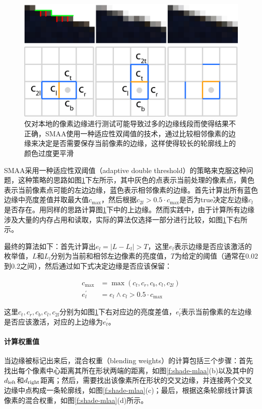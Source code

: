 \begin{figure}
\sidecaption
	\includegraphics[width=.65\textwidth]{figures/shade/local-contrast-adaptation}
	\caption{仅对本地的像素边缘进行测试可能导致过多的边缘线段而使得结果不正确，SMAA使用一种适应性双阈值的技术，通过比较相邻像素的边缘来决定是否需要保存当前像素的边缘，这样使得较长的轮廓线上的颜色过度更平滑}
	\label{f:shade-local-contrast-adaptation}
\end{figure}

SMAA采用一种适应性双阈值（adaptive double threshold）的策略来克服这种问题，这种策略的思路如图\ref{f:shade-local-contrast-adaptation}下左所示，其中灰色的点表示当前处理的像素点，黄色表示当前像素点可能的左边边缘，蓝色表示相邻像素的边缘。首先计算出所有蓝色边缘中亮度差值并取最大值$c_{\max}$，然后根据$c_{2l}>0.5\cdot c_{\max}$是否为true决定左边缘$c_l$是否存在。用同样的思路计算图\ref{f:shade-local-contrast-adaptation}下中的上边缘。然而实践中，由于计算所有边缘涉及大量的内存占用和读取，实际的算法仅选择一部分进行比较，如图\ref{f:shade-local-contrast-adaptation}下右所示。

最终的算法如下：首先计算出$e_l=|L-L_l|>T$，这里$e_l$表示边缘是否应该激活的枚举值，$L$和$L_l$分别为当前和相邻左边像素的亮度值，$T$为给定的阈值（通常在0.02到0.2之间），然后通过如下式决定边缘是否应该保留：

\begin{equation}
	\begin{aligned}
		c_{\max}&=\max(c_t,c_r,c_b,c_l,c_{2l})\\
		e^{'}_l&=e_l\wedge c_l>0.5\cdot c_{\max}
	\end{aligned}
\end{equation}

这里$c_t,c_r,c_b,c_l,c_{2l}$分别为如图\ref{f:shade-local-contrast-adaptation}下右对应边的亮度差值，${e}^{'}_l$表示当前像素的左边缘是否应该激活，对应的上边缘为${e}^{'}_t$。






\paragraph{计算权重值}
当边缘被标记出来后，混合权重（blending weights）的计算包括三个步骤：首先找出每个像素中心距离其所在形状两端的距离，如图\ref{f:shade-mlaa}(b)以及其中的$d_{\rm left}$和$d_{\rm right}$距离；然后，需要找出该像素所在形状的交叉边缘，并连接两个交叉边缘中点构成一条轮廓线，如图\ref{f:shade-mlaa}(c)；最后，根据这条轮廓线计算该像素的混合权重，如图\ref{f:shade-mlaa}(d)所示。

